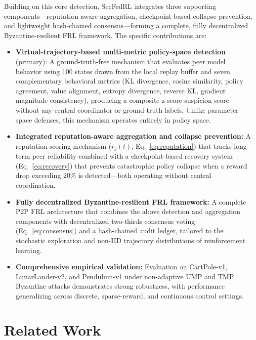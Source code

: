 \documentclass[12pt,a4paper]{article}
\begin{document}
Building on this core detection, SecFedRL integrates three supporting
components---reputation-aware aggregation, checkpoint-based collapse prevention, and
lightweight hash-chained consensus---forming a complete, fully decentralized
Byzantine-resilient FRL framework. The specific contributions are:
\begin{itemize}
  \item \textbf{Virtual-trajectory-based multi-metric policy-space detection} (primary):
        A ground-truth-free mechanism that evaluates peer model behavior using 100 states
        drawn from the local replay buffer and seven complementary behavioral metrics
        (KL divergence, cosine similarity, policy agreement, value alignment, entropy
        divergence, reverse KL, gradient magnitude consistency), producing a composite
        z-score suspicion score without any central coordinator or ground-truth labels.
        Unlike parameter-space defenses, this mechanism operates entirely in policy space.
  \item \textbf{Integrated reputation-aware aggregation and collapse prevention:}
        A reputation scoring mechanism ($r_j(t)$, Eq.~\ref{eq:reputation}) that tracks
        long-term peer reliability combined with a checkpoint-based recovery system
        (Eq.~\ref{eq:recovery}) that prevents catastrophic policy collapse when a reward
        drop exceeding 20\% is detected---both operating without central coordination.
  \item \textbf{Fully decentralized Byzantine-resilient FRL framework:} A complete P2P
        FRL architecture that combines the above detection and aggregation components
        with decentralized two-thirds consensus voting (Eq.~\ref{eq:consensus}) and a
        hash-chained audit ledger, tailored to the stochastic exploration and non-IID
        trajectory distributions of reinforcement learning.
  \item \textbf{Comprehensive empirical validation:} Evaluation on CartPole-v1,
        LunarLander-v2, and Pendulum-v1 under non-adaptive UMP and TMP Byzantine attacks
        demonstrates strong robustness, with performance generalizing across discrete,
        sparse-reward, and continuous control settings.
\end{itemize}

\section{Related Work}
\label{sec:related}
\end{document}
